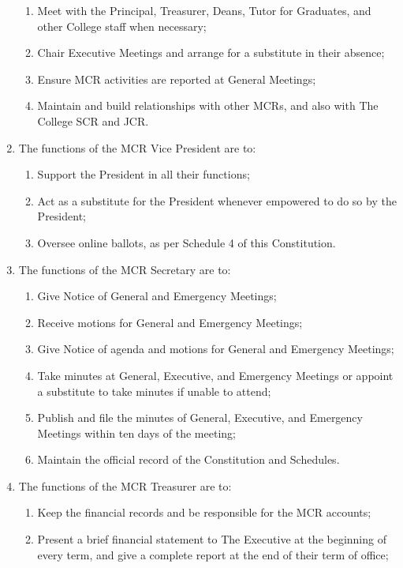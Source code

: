 \documentclass[11pt, a4paper]{article}
\begin{document}
\begin{enumerate}
\begin{enumerate}
        \item Meet with the Principal, Treasurer, Deans, Tutor for Graduates, and other College staff when necessary;
        \item Chair Executive Meetings and arrange for a substitute in their absence;
        \item Ensure MCR activities are reported at General Meetings;
        \item Maintain and build relationships with other MCRs, and also with The College SCR and JCR.
    \end{enumerate}
    \item The functions of the MCR Vice President are to:
    \begin{enumerate}
        \item Support the President in all their functions;
        \item Act as a substitute for the President whenever empowered to do so by the President;
        \item Oversee online ballots, as per Schedule 4 of this Constitution.
    \end{enumerate}
    \item The functions of the MCR Secretary are to:
    \begin{enumerate}
        \item Give Notice of General and Emergency Meetings;
        \item Receive motions for General and Emergency Meetings;
        \item Give Notice of agenda and motions for General and Emergency Meetings;
        \item Take minutes at General, Executive, and Emergency Meetings or appoint a substitute to take minutes if unable to attend;
        \item Publish and file the minutes of General, Executive, and Emergency Meetings within ten days of the meeting;
        \item Maintain the official record of the Constitution and Schedules.
    \end{enumerate}
    \item The functions of the MCR Treasurer are to:
    \begin{enumerate}
        \item Keep the financial records and be responsible for the MCR accounts;
        \item Present a brief financial statement to The Executive at the beginning of every term, and give a complete report at the end of their term of office;

\end{enumerate}
\end{enumerate}
\end{document}
